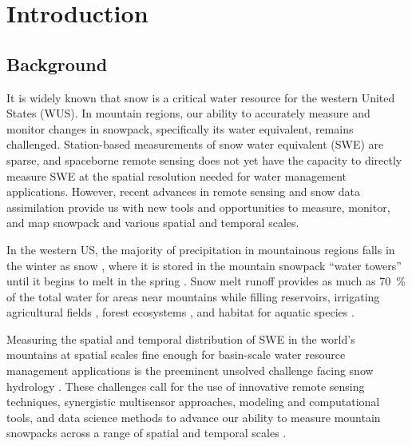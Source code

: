 
\hypertarget{ch1}{%
\chapter{Introduction}\label{ch1}}
\hypertarget{ch1-intro-2}{\section{Background}\label{ch1-intro-2}}

It is widely known that snow is a critical water resource for the western United States (WUS). In mountain regions, our ability to accurately measure and monitor changes in snowpack, specifically its water equivalent, remains challenged. 
Station-based measurements of snow water equivalent (SWE) are sparse, and spaceborne remote sensing does not yet have the capacity to directly measure SWE at the spatial resolution needed for water management applications. However, recent advances in remote sensing \citep{lievensSnowDepthVariability2019,tarriconeEstimatingSnowAccumulation2023a, tsangReviewArticleGlobal2022} and snow data assimilation \citep{margulisLandsatEraSierraNevada2016} provide us with new tools and opportunities to measure, monitor, and map snowpack and various spatial and temporal scales.

In the western US, the majority of precipitation in mountainous regions falls in the winter as snow \citep{serrezeCharacteristicsWesternUnited1999}, where it is stored in the mountain snowpack “water towers” until it begins to melt in the spring \citep{immerzeelImportanceVulnerabilityWorld2020,viviroliIncreasingDependenceLowland2020}. Snow melt runoff provides as much as 70~\% of the total water for areas near mountains \citep{liHowMuchRunoff2017} while filling reservoirs, irrigating agricultural fields \citep{qinSnowmeltRiskTelecouplings2022a}, forest ecosystems \citep{varholaForestCanopyEffects2010}, and habitat for aquatic species \citep{yarnellEcologyManagementSpring2010}. 

Measuring the spatial and temporal distribution of SWE in the world’s mountains at spatial scales fine enough for basin-scale water resource management applications is the preeminent unsolved challenge facing snow hydrology \citep{lettenmaierInroadsRemoteSensing2015, dozierEstimatingSpatialDistribution2016}. These challenges call for the use of innovative remote sensing techniques, synergistic multisensor approaches, modeling and computational tools, and data science methods to advance our ability to measure mountain snowpacks across a range of spatial and temporal scales \citep{dozierMountainHydrologySnow2011}. 

